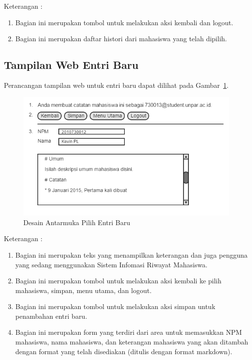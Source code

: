 Keterangan :
\begin{enumerate}[(1)]
\item
Bagian ini merupakan tombol untuk melakukan aksi kembali dan logout.	
\item
Bagian ini merupakan daftar histori dari mahasiswa yang telah dipilih.
\end{enumerate}

\subsection{Tampilan Web Entri Baru}
Perancangan tampilan web untuk entri baru dapat dilihat pada Gambar~\ref{fig:entribaru}.
\begin{figure}[H]
\centering
\includegraphics[scale=0.5]{Gambar/entribaru.png}
\caption[Desain Antarmuka Entri Baru]{Desain Antarmuka Pilih Entri Baru}
\label{fig:entribaru}
\end{figure}

Keterangan :
\begin{enumerate}[(1)]
\item
Bagian ini merupakan teks yang menampilkan keterangan dan juga pengguna yang
sedang menggunakan Sistem Infomasi Riwayat Mahasiswa.
\item
Bagian ini merupakan tombol untuk melakukan aksi kembali ke pilih mahasiswa,
simpan, menu utama, dan logout.
\item
Bagian ini merupakan tombol untuk melakukan aksi simpan untuk penambahan entri baru.
\item
Bagian ini merupakan form yang terdiri dari area untuk memasukkan NPM mahasiswa,
nama mahasiswa, dan keterangan mahasiswa yang akan ditambah dengan format yang
telah disediakan (ditulis dengan format markdown).
\end{enumerate}

